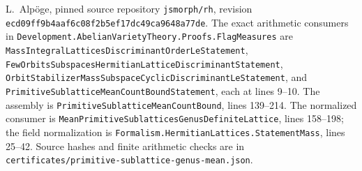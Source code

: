 L.~Alp\"oge, pinned source repository \texttt{jsmorph/rh},
revision \texttt{ecd09ff9b4aaf6c08f2b5ef17dc49ca9648a77de}.
The exact arithmetic consumers in
\texttt{Development.AbelianVarietyTheory.Proofs.FlagMeasures}
are \texttt{Mass\allowbreak Integral\allowbreak Lattices\allowbreak Discriminant\allowbreak Order\allowbreak Le\allowbreak Statement},
\texttt{Few\allowbreak Orbits\allowbreak Subspaces\allowbreak Hermitian\allowbreak Lattice\allowbreak Discriminant\allowbreak Statement},
\texttt{OrbitStabilizerMassSubspaceCyclicDiscriminantLeStatement},
and \texttt{PrimitiveSublatticeMeanCountBoundStatement},
each at lines 9--10.  The assembly is
\texttt{PrimitiveSublatticeMeanCountBound}, lines 139--214.
The normalized consumer is
\texttt{Mean\allowbreak Primitive\allowbreak Sublattices\allowbreak Genus\allowbreak Definite\allowbreak Lattice},
lines 158--198; the field normalization is
\texttt{Formalism.HermitianLattices.StatementMass}, lines 25--42.
Source hashes and finite arithmetic checks are in
\texttt{certificates/primitive-sublattice-genus-mean.json}.
